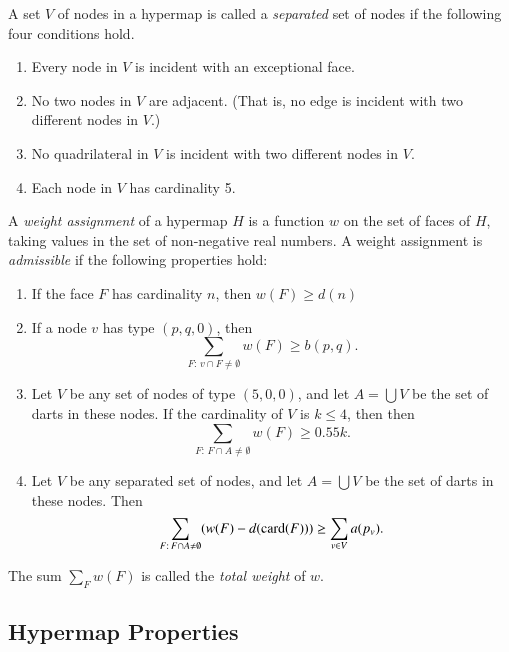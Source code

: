 \begin{definition}
A set $V$ of nodes in a hypermap is called a {\it separated\/} set
of nodes if the following four conditions hold.
%
    \begin{enumerate}
      \item Every node in $V$ is incident with an exceptional face.
      \item No two
        nodes in $V$ are adjacent.  (That is, no edge is incident
        with two different nodes in $V$.)
      \item No quadrilateral in $V$ is incident with two different nodes
        in $V$.
      \item Each node in $V$ has cardinality 5.
    \end{enumerate}
\end{definition}

\begin{definition}
%
A {\it weight assignment\/} of a hypermap $H$ is a function $w$ on
the set of faces of $H$, taking values in the set of non-negative
real numbers. A weight assignment is {\it admissible} if the
following properties hold:
%
\begin{enumerate}
  \item If the face $F$ has cardinality $n$, then
        $w(F) \ge d(n)$
  \item If a node $v$ has type $(p,q,0)$, then
        $$\sum_{F:\,v\cap F\ne\emptyset} w(F) \ge b(p,q).$$
        \label{admissible:b}
  \item Let $V$ be any set of nodes of type $(5,0,0)$, and let $A =\bigcup V$ be
        the set of darts in these nodes.
        If the cardinality of $V$ is $k\le 4$, then
        then
        $$\sum_{F:\,F\cap A\ne\emptyset} w(F) \ge 0.55 k.$$
  \item Let $V$ be any separated set of nodes, and let $A =\bigcup V$ be
        the set of darts in these nodes.
        Then
        $$\sum_{F:\,F\cap A\ne\emptyset} (w(F) -d({\operatorname{card}}(F)))
            \ge \sum_{v\in V} a(p_v).$$
        \label{definition:admissible:excess}
\end{enumerate}
The sum $\sum_F w(F)$ is called the {\it total weight} of $w$.
\end{definition}





\subsection{Hypermap Properties}
\label{sec:graphproperty}

